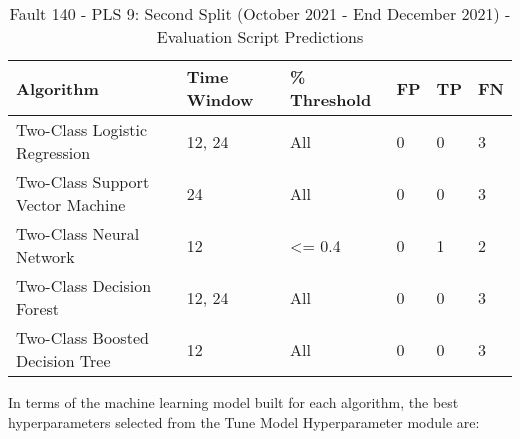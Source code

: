 \begin{table}[!ht]
    \centering
    \begin{tabular}{|l|l|l|l|l|l|}
    \hline
        Algorithm & Time Window & \% Threshold & FP & TP & FN \\ \hline
        Two-Class Logistic Regression & 12, 24 & All & 0 & 0 & 3 \\ \hline
        Two-Class Support Vector Machine & 24 & All & 0 & 0 & 3 \\ \hline
        Two-Class Neural Network & 12 & <= 0.4 & 0 & 1 & 2 \\ \hline
        Two-Class Decision Forest & 12, 24 & All & 0 & 0 & 3 \\ \hline
        Two-Class Boosted Decision Tree & 12 & All & 0 & 0 & 3 \\ \hline
    \end{tabular}
    \caption{Fault 140 - PLS 9: Second Split (October 2021 - End December 2021) - Evaluation Script Predictions}
    \label{9112_SCA34_1st}
\end{table}

In terms of the machine learning model built for each algorithm, the best hyperparameters selected from the Tune Model Hyperparameter module are:

